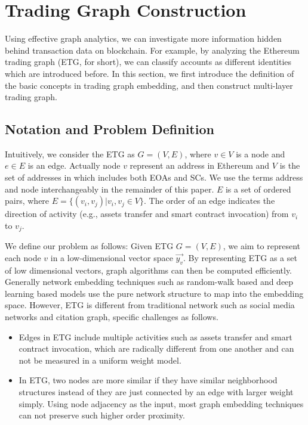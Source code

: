 
\section{Trading Graph Construction}
Using effective graph analytics, we can investigate more information hidden behind transaction data on blockchain. For example, by analyzing the Ethereum trading graph (ETG, for short), we can classify accounts as different identities which are introduced before. In this section, we first introduce the definition of the basic concepts in trading graph embedding, and then construct multi-layer trading graph.

\subsection{Notation and Problem Definition}
Intuitively, we consider the ETG as $G=(V,E)$, where $v \in V$ is a node and $e \in E$ is an edge. Actually node $v$ represent an address in Ethereum and $V$ is the set of addresses in which includes both EOAs and SCs. We use the terms address and node interchangeably in the remainder of this paper. $E$ is a set of ordered pairs, where $E=\{(v_i,v_j)|v_i,v_j \in V\}$. The order of an edge indicates the direction of activity (e.g., assets transfer and smart contract invocation) from $v_i$ to $v_j$. 

We define our problem as follows: Given ETG $G=(V,E)$, we aim to represent each node $v$ in a low-dimensional vector space $\vec{y_v}$. By representing ETG as a set of low dimensional vectors, graph algorithms can then be computed efficiently. Generally network embedding techniques such as random-walk based and deep learning based models use the pure network structure to map into the embedding space\cite{goyal2018capturing}. However, ETG is different from traditional network such as social media networks and citation graph, specific challenges as follows. 

\begin{itemize}
\item Edges in ETG include multiple activities such as assets transfer and smart contract invocation, which are radically different from one another and can not be measured in a uniform weight model.
\item In ETG, two nodes are more similar if they have similar neighborhood structures instead of they are just connected by an edge with larger weight simply. Using node adjacency as the input, most graph embedding techniques can not preserve such higher order proximity.
\end{itemize}

